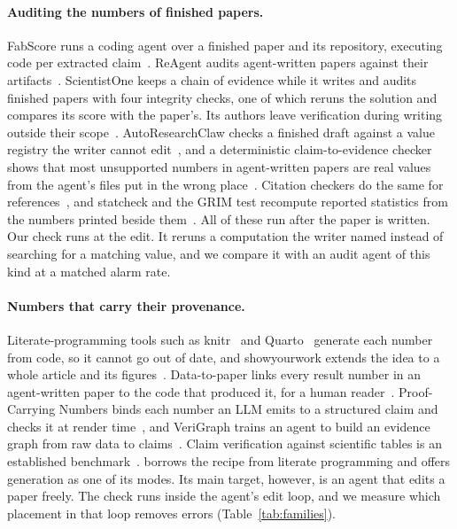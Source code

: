 \paragraph{Auditing the numbers of finished papers.}
FabScore runs a coding agent over a finished paper and its repository, executing code per extracted
claim~\cite{chen2026fabscore}. ReAgent audits agent-written papers against their artifacts~\cite{shen2026reagent}.
ScientistOne keeps a chain of evidence while it writes and audits finished papers with four integrity checks, one of
which reruns the solution and compares its score with the paper's. Its authors leave verification during writing
outside their scope~\cite{meng2026scientistone}. AutoResearchClaw checks a finished draft against a
value registry the writer cannot edit~\cite{autoresearchclaw2026}, and a deterministic claim-to-evidence checker
shows that most unsupported numbers in agent-written papers are real values from the agent's files put in the wrong
place~\cite{alfaqeeh2026misattributed}. Citation checkers do the same for
references~\cite{gptzero2026neurips,refverifier2026}, and statcheck and the GRIM test recompute reported statistics
from the numbers printed beside them~\cite{nuijten2016statcheck,brown2017grim}. All of these run after the paper is
written. Our check runs at the edit. It reruns a computation the writer named instead of searching for a matching
value, and we compare it with an audit agent of this kind at a matched alarm rate.

\paragraph{Numbers that carry their provenance.}
Literate-programming tools such as knitr~\cite{xie2015knitr} and Quarto~\cite{allaire2026quarto} generate each number
from code, so it cannot go out of date, and showyourwork extends the idea to a whole article and its
figures~\cite{luger2021showyourwork}. Data-to-paper links every result number in an agent-written paper to the code
that produced it, for a human reader~\cite{ifargan2024datatopaper}. Proof-Carrying Numbers binds each number an LLM
emits to a structured claim and checks it at render time~\cite{solatorio2025pcn}, and VeriGraph trains an agent to
build an evidence graph from raw data to claims~\cite{jin2026verigraph}. Claim verification against scientific tables
is an established benchmark~\cite{lu2023scitab}. \tool{} borrows the recipe from literate programming and offers
generation as one of its modes. Its main target, however, is an agent that edits a paper freely. The check runs
inside the agent's edit loop, and we measure which placement in that loop removes errors (Table~\ref{tab:families}).

